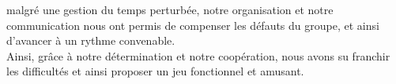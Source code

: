 			malgré une gestion du temps perturbée, notre organisation et notre communication nous ont permis de compenser les défauts du groupe, et ainsi d'avancer à un rythme convenable. \\
			Ainsi, grâce à notre détermination et notre coopération, nous avons su franchir les difficultés et ainsi proposer un jeu fonctionnel et amusant.
